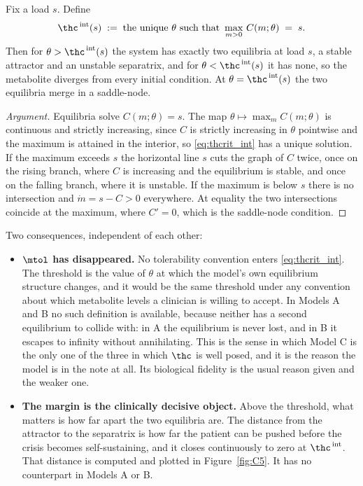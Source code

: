 \begin{proposition}
\label{prop:intrinsic}
Fix a load $s$. Define
\begin{equation}
\thc^{\,\mathrm{int}}(s) \;:=\; \text{the unique } \theta \text{ such that }
\max_{m > 0}\, C(m;\theta) \;=\; s .
\label{eq:thcrit_int}
\end{equation}
Then for $\theta > \thc^{\,\mathrm{int}}(s)$ the system has exactly two equilibria at load
$s$, a stable attractor and an unstable separatrix, and for
$\theta < \thc^{\,\mathrm{int}}(s)$ it has none, so the metabolite diverges from every
initial condition. At $\theta = \thc^{\,\mathrm{int}}(s)$ the two equilibria merge in a
saddle-node.
\end{proposition}

\begin{proof}[Argument]
Equilibria solve $C(m;\theta) = s$. The map $\theta \mapsto \max_m C(m;\theta)$ is
continuous and strictly increasing, since $C$ is strictly increasing in $\theta$ pointwise
and the maximum is attained in the interior, so \eqref{eq:thcrit_int} has a unique
solution. If the maximum exceeds $s$ the horizontal line $s$ cuts the graph of $C$ twice,
once on the rising branch, where $C$ is increasing and the equilibrium is stable, and once
on the falling branch, where it is unstable. If the maximum is below $s$ there is no
intersection and $\dot m = s - C > 0$ everywhere. At equality the two intersections
coincide at the maximum, where $C' = 0$, which is the saddle-node condition.
\end{proof}

Two consequences, independent of each other:

\begin{itemize}[leftmargin=*, itemsep=3pt]
\item \label{item:wellposed}\textbf{$\mtol$ has disappeared.} No tolerability convention enters
\eqref{eq:thcrit_int}. The threshold is the value of $\theta$ at which the model's own
equilibrium structure changes, and it would be the same threshold under any convention
about which metabolite levels a clinician is willing to accept. In Models A and B no such
definition is available, because neither has a second equilibrium to collide with: in A the
equilibrium is never lost, and in B it escapes to infinity without annihilating. This is
the sense in which Model C is the only one of the three in which $\thc$ is well posed, and
it is the reason the model is in the note at all. Its biological fidelity is the usual
reason given and the weaker one.
\item \textbf{The margin is the clinically decisive object.} Above the threshold, what
matters is how far apart the two equilibria are. The
distance from the attractor to the separatrix is how far the patient can be pushed before
the crisis becomes self-sustaining, and it closes continuously to zero at
$\thc^{\,\mathrm{int}}$. That distance is computed and plotted in
Figure~\ref{fig:C5}. It has no counterpart in Models A or B.
\end{itemize}

